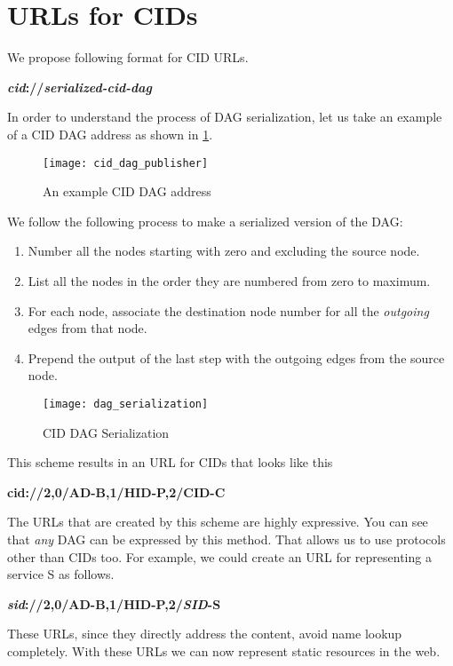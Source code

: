 \section{URLs for CIDs}
\label{sec:urlcid}
We propose following format for CID URLs.
\begin{center}
  \textbf{\textit{cid}://\textit{serialized-cid-dag}}
\end{center}
In order to understand the process of DAG serialization, let us take
an example of a CID DAG address as shown in \ref{fig:cid_dag}.

\begin{figure}
  \begin{center}
    \label{fig:cid_dag}
    \texttt{[image: cid\_dag\_publisher]}
    \caption{An example CID DAG address}
  \end{center}
\end{figure}

We follow the following process to make a serialized version of the
DAG:
\begin{enumerate}
  \item{Number all the nodes starting with zero and excluding the
    source node.}
  \item{List all the nodes in the order they are numbered from zero to
    maximum.}
  \item{For each node, associate the destination node number for all
    the \textit{outgoing} edges from that node.}
  \item{Prepend the output of the last step with the outgoing edges
    from the source node.}
\end{enumerate}

\begin{figure}
  \begin{center}
  \label{fig:cid_dag_serialization}
  \texttt{[image: dag\_serialization]}
  \caption{CID DAG Serialization}
  \end{center}
\end{figure}

This scheme results in an URL for CIDs that looks like this
\begin{center}
  \textbf{cid://2,0/AD-B,1/HID-P,2/CID-C}
\end{center}
The URLs that are created by this scheme are highly expressive. You
can see that \emph{any} DAG can be expressed by this method. That
allows us to use protocols other than CIDs too. For example, we could
create an URL for representing a service S as follows.
\begin{center}
  \textbf{\emph{sid}://2,0/AD-B,1/HID-P,2/\emph{SID}-S}
\end{center}
These URLs, since they directly address the content, avoid name lookup
completely. With these URLs we can now represent static resources in
the web.

